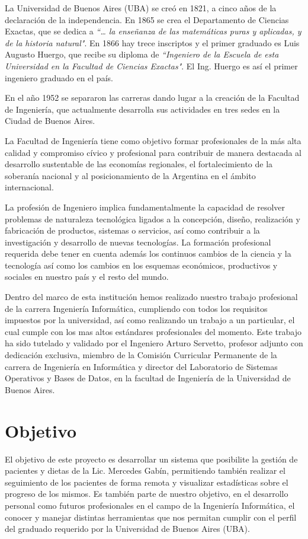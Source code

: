 \documentclass[runningheads,a4paper,spanish]{llncs}
\begin{document}
La Universidad de Buenos Aires (UBA) se creó en 1821, a cinco años de la declaración
de la independencia. En 1865 se crea el Departamento de Ciencias Exactas,
que se dedica a \textit{“… la enseñanza de las matemáticas puras y aplicadas, y de la historia
natural"}. En 1866 hay trece inscriptos y el primer graduado es Luis Augusto Huergo,
que recibe su diploma de \textit{“Ingeniero de la Escuela de esta Universidad en la
Facultad de Ciencias Exactas"}. El Ing. Huergo es así el primer ingeniero graduado
en el país.

En el año 1952 se separaron las carreras dando lugar a la creación de la Facultad
de Ingeniería, que actualmente desarrolla sus actividades en tres sedes en la Ciudad
de Buenos Aires.

La Facultad de Ingeniería tiene como objetivo formar profesionales de la más alta
calidad y compromiso cívico y profesional para contribuir de manera destacada al
desarrollo sustentable de las economías regionales, el fortalecimiento de la soberanía
nacional y al posicionamiento de la Argentina en el ámbito internacional.

La profesión de Ingeniero implica fundamentalmente la capacidad de resolver
problemas de naturaleza tecnológica ligados a la concepción, diseño, realización y
fabricación de productos, sistemas o servicios, así como contribuir a la investigación
y desarrollo de nuevas tecnologías. La formación profesional requerida debe tener en
cuenta además los continuos cambios de la ciencia y la tecnología así como los
cambios en los esquemas económicos, productivos y sociales en nuestro país y el
resto del mundo.\cite{carrera}

Dentro del marco de esta institución hemos realizado nuestro trabajo profesional de la carrera Ingeniería Informática, cumpliendo con todos los requisitos impuestos por la universidad, así como realizando un trabajo a un particular, el cual cumple con los mas altos estándares profesionales del momento. Este trabajo ha sido tutelado y validado por el Ingeniero Arturo Servetto, profesor adjunto con dedicación exclusiva, miembro de la Comisión Curricular Permanente de la carrera de Ingeniería en Informática y director del Laboratorio de Sistemas Operativos y Bases de Datos, en la facultad de Ingeniería de la Universidad de Buenos Aires.


\section{Objetivo}
El objetivo de este proyecto es desarrollar un sistema que posibilite la gestión de pacientes y dietas de la Lic. Mercedes Gabín, permitiendo también realizar el seguimiento de los pacientes de forma remota y visualizar estadísticas sobre el progreso de los mismos.  Es también parte de nuestro objetivo, en el desarrollo personal como futuros profesionales en el campo de la Ingeniería Informática, el conocer y manejar distintas herramientas que nos permitan cumplir con el perfil del graduado requerido por la Universidad de Buenos Aires (UBA).
\cite{computacion}
\end{document}
